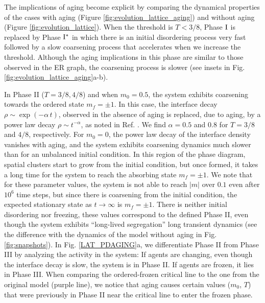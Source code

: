 The implications of aging become explicit by comparing the dynamical properties of the cases with aging (Figure \ref{fig:evolution_lattice_aging}) and without aging (Figure \ref{fig:evolution_lattice}). When the threshold is $T<3/8$, Phase ${\rm I}$ is replaced by Phase ${\rm I}^{*}$ in which there is an initial disordering process very fast followed by a slow coarsening process that accelerates when we increase the threshold. Although the aging implications in this phase are similar to those observed in the ER graph, the coarsening process is slower  (see insets in Fig. \ref{fig:evolution_lattice_aging}a-b).

In Phase II ($T=3/8, 4/8$) and when $m_0=0.5$, the system exhibits coarsening towards the ordered state $m_f=\pm 1$. In this case, the interface decay $\rho \sim \exp(-\alpha \, t)$, observed in the absence of aging is replaced, due to aging, by a power law decay $\rho \sim t^{-\alpha}$, as noted in Ref. \cite{Abella-2022-AME}. We find $\alpha=0.5$ and $0.8$ for $T=3/8$ and $4/8$, respectively. For $m_0=0$, the power law decay of the interface density vanishes with aging, and the system exhibits coarsening dynamics much slower than for an unbalanced initial condition. In this region of the phase diagram, spatial clusters start to grow from the initial condition, but once formed, it takes a long time for the system to reach the absorbing state $m_f = \pm 1$. 
We note that for these parameter values, the system is not able to reach $|m|$ over $0.1$ even after $10^6$ time steps, but since there is coarsening from the initial condition, the expected stationary state as $t \to \infty$ is $m_f=\pm1$. There is neither initial disordering nor freezing, these values correspond to the defined Phase II, even though the system exhibits ``long-lived segregation'' long transient dynamics (see the difference with the dynamics of the model without aging in Fig. \ref{fig:snapshots}). In Fig. \ref{LAT_PDAGING}a, we differentiate Phase II from Phase III by analyzing the activity in the system: If agents are changing, even though the interface decay is slow, the system is in Phase II. If agents are frozen, it lies in Phase III. When comparing the ordered-frozen critical line to the one from the original model (purple line), we notice that aging causes certain values ($m_0$, $T$) that were previously in Phase II near the critical line to enter the frozen phase.

